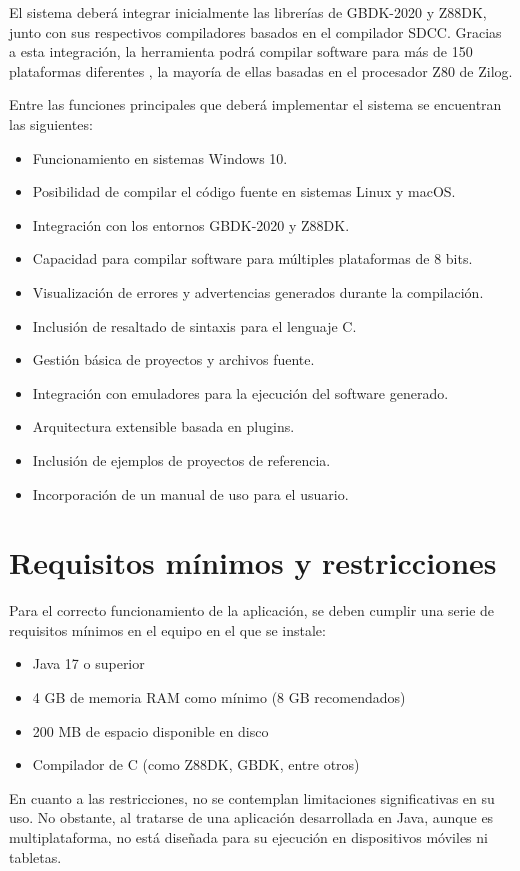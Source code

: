 \documentclass[../../main.tex]{subfiles}
\begin{document}
\par{El sistema deberá integrar inicialmente las librerías de GBDK-2020 y Z88DK, junto con sus respectivos compiladores basados en el compilador SDCC. Gracias a esta integración, la herramienta podrá compilar software para más de 150 plataformas diferentes \cite{z88dk_platforms} \cite{gbdk_supported_consoles}, la mayoría de ellas basadas en el procesador Z80 de Zilog.}

\par{Entre las funciones principales que deberá implementar el sistema se encuentran las siguientes:}

\begin{itemize}
    \item Funcionamiento en sistemas Windows 10.
    \item Posibilidad de compilar el código fuente en sistemas Linux y macOS.
    \item Integración con los entornos GBDK-2020 y Z88DK.
    \item Capacidad para compilar software para múltiples plataformas de 8 bits.
    \item Visualización de errores y advertencias generados durante la compilación.
    \item Inclusión de resaltado de sintaxis para el lenguaje C.
    \item Gestión básica de proyectos y archivos fuente.
    \item Integración con emuladores para la ejecución del software generado.
    \item Arquitectura extensible basada en plugins.
    \item Inclusión de ejemplos de proyectos de referencia.
    \item Incorporación de un manual de uso para el usuario.
\end{itemize}

\clearpage


\section{Requisitos mínimos y restricciones}
\label{S:requisitos}

\par{Para el correcto funcionamiento de la aplicación, se deben cumplir una serie de requisitos mínimos en el equipo en el que se instale:}
\begin{itemize}
    \item Java 17 o superior 
    \item 4 GB de memoria RAM como mínimo (8 GB recomendados) 
    \item 200 MB de espacio disponible en disco 
    \item Compilador de C (como Z88DK, GBDK, entre otros) 
\end{itemize}
\par{En cuanto a las restricciones, no se contemplan limitaciones significativas en su uso. No obstante, al tratarse de una aplicación desarrollada en Java, aunque es multiplataforma, no está diseñada para su ejecución en dispositivos móviles ni tabletas.}
\end{document}
